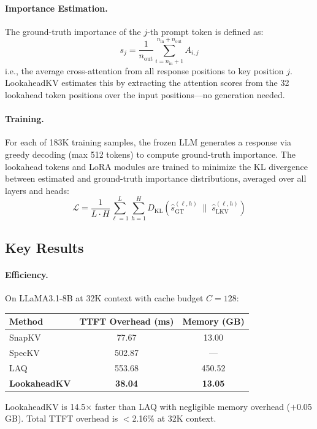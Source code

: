 \documentclass[11pt]{article}
\begin{document}
\paragraph{Importance Estimation.}
The ground-truth importance of the $j$-th prompt token is defined as:
\[
s_j = \frac{1}{n_{\mathrm{out}}} \sum_{i=n_{\mathrm{in}}+1}^{n_{\mathrm{in}}+n_{\mathrm{out}}} A_{i,j}
\]
i.e., the average cross-attention from all response positions to key position $j$.
LookaheadKV estimates this by extracting the attention scores from the 32 lookahead token positions over the input positions---no generation needed.

\paragraph{Training.}
For each of 183K training samples, the frozen LLM generates a response via greedy decoding (max 512 tokens) to compute ground-truth importance. The lookahead tokens and LoRA modules are trained to minimize the KL divergence between estimated and ground-truth importance distributions, averaged over all layers and heads:
\[
\mathcal{L} = \frac{1}{L \cdot H} \sum_{\ell=1}^{L} \sum_{h=1}^{H} D_{\mathrm{KL}}\!\left(\hat{s}_{\mathrm{GT}}^{(\ell,h)} \;\|\; \hat{s}_{\mathrm{LKV}}^{(\ell,h)}\right)
\]

\subsection{Key Results}

\paragraph{Efficiency.}
On LLaMA3.1-8B at 32K context with cache budget $C\!=\!128$:
\begin{center}
\begin{tabular}{lcc}
\toprule
\textbf{Method} & \textbf{TTFT Overhead (ms)} & \textbf{Memory (GB)} \\
\midrule
SnapKV & 77.67 & 13.00 \\
SpecKV & 502.87 & --- \\
LAQ & 553.68 & 450.52 \\
\textbf{LookaheadKV} & \textbf{38.04} & \textbf{13.05} \\
\bottomrule
\end{tabular}
\end{center}
LookaheadKV is 14.5$\times$ faster than LAQ with negligible memory overhead ($+$0.05\,GB). Total TTFT overhead is $<$2.16\% at 32K context.
\end{document}
